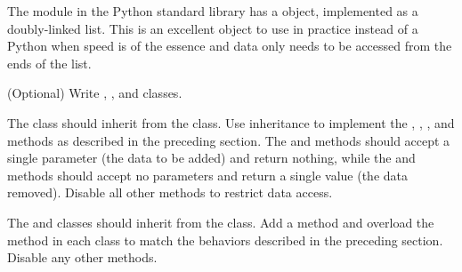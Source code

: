 The  module in the Python standard library has a  object, implemented as a doubly-linked list.
This is an excellent object to use in practice instead of a Python  when speed is of the essence and data only needs to be accessed from the ends of the list.

\begin{problem}
(Optional) Write , , and  classes.

The  class should inherit from the  class.
Use inheritance to implement the , , , and  methods as described in the preceding section.
The  and  methods should accept a single parameter (the data to be added) and return nothing, while the  and  methods should accept no parameters and return a single value (the data removed).
Disable all other methods to restrict data access.

The  and  classes should inherit from the  class.
Add a  method and overload the  method in each class to match the behaviors described in the preceding section.
Disable any other methods.
\end{problem}
